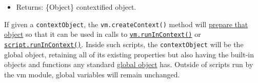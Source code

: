 \begin{itemize}
\begin{itemize}
    \begin{itemize}
    \tightlist
    \item
      \texttt{specifier} \{string\} specifier passed to
      \texttt{import()}
    \item
      \texttt{contextObject} \{Object\} contextified object
    \item
      \texttt{importAttributes} \{Object\} The \texttt{"with"} value
      passed to the
      \href{https://tc39.es/proposal-import-attributes/\#sec-evaluate-import-call}{\texttt{optionsExpression}}
      optional parameter, or an empty object if no value was provided.
    \item
      Returns: \{Module Namespace Object\textbar vm.Module\} Returning a
      \texttt{vm.Module} is recommended in order to take advantage of
      error tracking, and to avoid issues with namespaces that contain
      \texttt{then} function exports.
    \end{itemize}
  \end{itemize}
\item
  Returns: \{Object\} contextified object.
\end{itemize}

If given a \texttt{contextObject}, the \texttt{vm.createContext()}
method will \hyperref[what-does-it-mean-to-contextify-an-object]{prepare
that object} so that it can be used in calls to
\hyperref[vmrunincontextcode-contextifiedobject-options]{\texttt{vm.runInContext()}}
or
\hyperref[scriptrunincontextcontextifiedobject-options]{\texttt{script.runInContext()}}.
Inside such scripts, the \texttt{contextObject} will be the global
object, retaining all of its existing properties but also having the
built-in objects and functions any standard
\href{https://es5.github.io/\#x15.1}{global object} has. Outside of
scripts run by the vm module, global variables will remain unchanged.

